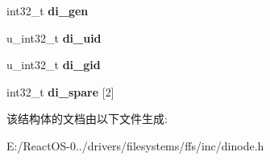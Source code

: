 \begin{DoxyCompactItemize}
\mbox{\label{structufs1__dinode_a0c83844df5375d0d7e3bf70b1fd20762}} 
int32\+\_\+t {\bfseries di\+\_\+gen}
\item 
\mbox{\label{structufs1__dinode_af748891980bbd2bd0d3eb22abca89688}} 
u\+\_\+int32\+\_\+t {\bfseries di\+\_\+uid}
\item 
\mbox{\label{structufs1__dinode_a3bead46ad3a23368d9986df416d5c7e2}} 
u\+\_\+int32\+\_\+t {\bfseries di\+\_\+gid}
\item 
\mbox{\label{structufs1__dinode_a91a277e4cb6f822b1bd692f5cd06fb97}} 
int32\+\_\+t {\bfseries di\+\_\+spare} \mbox{[}2\mbox{]}
\end{DoxyCompactItemize}


该结构体的文档由以下文件生成\+:\begin{DoxyCompactItemize}
\item 
E\+:/\+React\+O\+S-\/0../drivers/filesystems/ffs/inc/dinode.\+h\end{DoxyCompactItemize}
